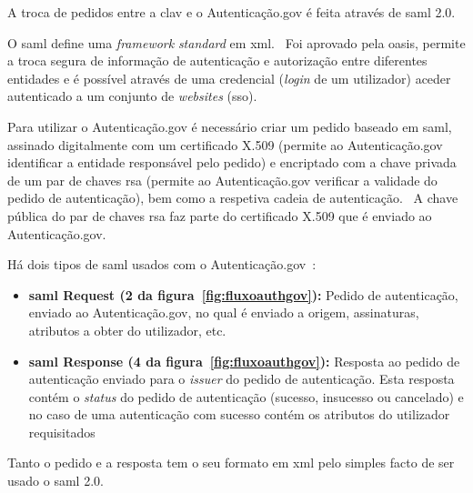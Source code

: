 A troca de pedidos entre a \acrshort{clav} e o Autenticação.gov é feita através de \acrshort{saml} 2.0.

O \acrfull{saml} define uma \textit{framework} \textit{standard} em \acrshort{xml}.~\cite{sam2man} Foi aprovado pela \acrshort{oasis}, permite a troca segura de informação de autenticação e autorização entre diferentes entidades e é possível através de uma credencial (\textit{login} de um utilizador) aceder autenticado a um conjunto de \textit{websites} (\acrshort{sso}).

Para utilizar o Autenticação.gov é necessário criar um pedido baseado em \acrshort{saml}, assinado digitalmente com um certificado X.509 (permite ao Autenticação.gov identificar a entidade responsável pelo pedido) e encriptado com a chave privada de um par de chaves \acrshort{rsa} (permite ao Autenticação.gov verificar a validade do pedido de autenticação), bem como a respetiva cadeia de autenticação.~\cite{otavioTese} A chave pública do par de chaves \acrshort{rsa} faz parte do certificado X.509 que é enviado ao Autenticação.gov.

Há dois tipos de \acrshort{saml} usados com o Autenticação.gov~\cite{otavioTese}:
\begin{itemize}
    \item \textbf{\acrshort{saml} Request (2 da figura~\ref{fig:fluxoauthgov}):} Pedido de autenticação, enviado ao Autenticação.gov, no qual é enviado a origem, assinaturas, atributos a obter do utilizador, etc.
    \item \textbf{\acrshort{saml} Response (4 da figura~\ref{fig:fluxoauthgov}):} Resposta ao pedido de autenticação enviado para o \textit{issuer} do pedido de autenticação. Esta resposta contém o \textit{status} do pedido de autenticação (sucesso, insucesso ou cancelado) e no caso de uma autenticação com sucesso contém os atributos do utilizador requisitados
\end{itemize}

Tanto o pedido e a resposta tem o seu formato em \acrshort{xml} pelo simples facto de ser usado o \acrshort{saml} 2.0.

